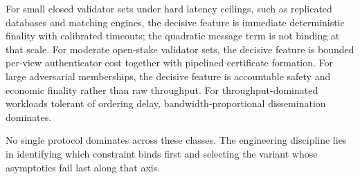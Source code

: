 For small closed validator sets under hard latency ceilings, such as replicated databases and matching engines, the decisive feature is immediate deterministic finality with calibrated timeouts; the quadratic message term is not binding at that scale. For moderate open-stake validator sets, the decisive feature is bounded per-view authenticator cost together with pipelined certificate formation. For large adversarial memberships, the decisive feature is accountable safety and economic finality rather than raw throughput. For throughput-dominated workloads tolerant of ordering delay, bandwidth-proportional dissemination dominates.

No single protocol dominates across these classes. The engineering discipline lies in identifying which constraint binds first and selecting the variant whose asymptotics fail last along that axis.
